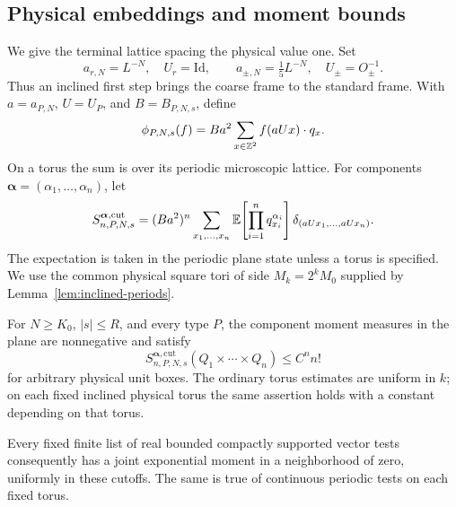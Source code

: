 \subsection{Physical embeddings and moment bounds}

We give the terminal lattice spacing the physical value one.  Set
\begin{equation}
 a_{r,N}=L^{-N},\quad U_r=\mathrm{Id},\qquad
 a_{\pm,N}=\tfrac15L^{-N},\quad U_\pm=O_\pm^{-1}.
 \label{eq:offset-embeddings}
\end{equation}
Thus an inclined first step brings the coarse frame to the standard
frame.  With $a=a_{P,N}$, $U=U_P$, and $B=B_{P,N,s}$, define
\begin{equation}
 \phi_{P,N,s}(f)=Ba^2\sum_{x\in\mathbb Z^2} f(aUx)\cdot q_x.
 \label{eq:offset-fields}
\end{equation}
On a torus the sum is over its periodic microscopic lattice.  For
components $\boldsymbol\alpha=(\alpha_1,\ldots,\alpha_n)$, let
\begin{equation}
 S_{n,P,N,s}^{\boldsymbol\alpha,\mathrm{cut}}
 =(Ba^2)^n\sum_{x_1,\ldots,x_n}
       \mathbb E\!\left[\prod_{i=1}^nq_{x_i}^{\alpha_i}\right]
       \delta_{(aUx_1,\ldots,aUx_n)}.
 \label{eq:offset-moment-measures}
\end{equation}
The expectation is taken in the periodic plane state unless a torus is
specified.  We use the common physical square tori of side
$M_k=2^kM_0$ supplied by Lemma~\ref{lem:inclined-periods}.

\begin{lemma}
\label{lem:moment-bound}
For $N\ge K_0$, $|s|\le R$, and every type $P$, the component moment
measures in the plane are nonnegative and satisfy
\begin{equation}
 S_{n,P,N,s}^{\boldsymbol\alpha,\mathrm{cut}}
      (Q_1\times\cdots\times Q_n)\le C^n n!
 \label{eq:offset-unit-box-bound}
\end{equation}
for arbitrary physical unit boxes.  The ordinary torus estimates are
uniform in $k$; on each fixed inclined physical torus the same assertion
holds with a constant depending on that torus.

Every fixed finite list of real bounded compactly supported vector
tests consequently has a joint exponential moment in a neighborhood
of zero, uniformly in these cutoffs.  The same is true of continuous
periodic tests on each fixed torus.
\end{lemma}

